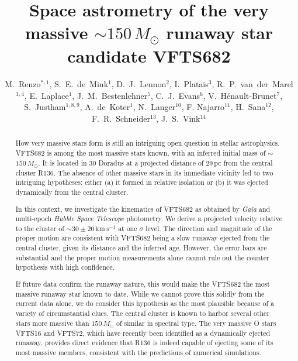 \documentclass[apjl,twocolumn]{emulateapj}
\newcommand{\kms}{{\,\mathrm{km\ s^{-1}}}}
\begin{document}
\title{Space astrometry of the very massive $\sim$$150\,M_\odot$ runaway star candidate VFTS682}

\author{M.~Renzo$^{*,1}$, S.~E.~de~Mink$^{1}$, D.~J.~Lennon$^{2}$, I.~Platais$^{3}$,
  R.~P.~van~der~Marel$^{3,4}$, E.~Laplace$^{1}$,
  J.~M.~Bestenlehner$^{5}$, C.~J.~Evans$^{6}$,
  V.~H\'enault-Brunet$^{7}$,  S.~Justham$^{1,8,9}$,  A.~de~Koter$^{1}$,
  N.~Langer$^{10}$, F. Najarro$^{11}$, H.~Sana$^{12}$, F.~R.~Schneider$^{13}$, J.~S.~Vink$^{14}$}

\begin{abstract}
 
How very massive stars form is still an intriguing open question in
stellar astrophysics.  VFTS682 is among the most massive stars known,
with an inferred initial mass of $\sim$$150\,M_\odot$. It is located
in 30 Doradus at a projected distance of 29\,pc from the central
cluster R136. %
The absence of other massive stars in its immediate vicinity
led to two intriguing hypotheses: %
either (a) it formed in relative isolation %
or (b) it was ejected dynamically from the central cluster. 
 
In this context, 
we investigate the kinematics of
VFTS682 as obtained by \emph{Gaia} and multi-epoch \emph{Hubble Space
  Telescope} photometry. We derive a projected velocity relative to
the cluster of $\sim$$30\pm20\kms$ at one $\sigma$ level.  The direction and magnitude of
the proper motion are consistent with VFTS682 being a slow runaway
ejected from the central cluster, given its distance and the inferred age.  However, the error bars are substantial and the proper motion measurements alone cannot rule out the counter hypothesis with high confidence.   
 
If future data confirm the runaway nature, this would make the VFTS682
the most massive runaway star known to date.  While we cannot prove
this solidly from the current data alone, we do consider this
hypothesis as the most plausible because of a variety of
circumstantial clues. The central cluster is known to harbor several
other stars more massive than $150\,M_\odot$ of similar in spectral type.
The very massive O stars VFTS16 and VFTS72, which have recently been identified as a dynamically ejected runaway, provides direct evidence that R136 is indeed capable of ejecting some of its most massive members, consistent with the predictions of numerical simulations.
\end{abstract}
\end{document}
